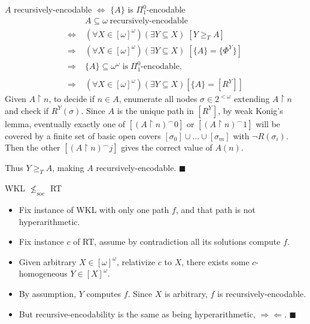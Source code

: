 \begin{frame}{$A$ recursively-encodable $\Leftrightarrow$
$\{A\}$ is $\Pi_1^0$-encodable}
  \begin{align*}
    \;&A\subseteq\omega\; \text{recursively-encodable}\\
    \Leftrightarrow\; & (\forall X\in[\omega]^\omega)(\exists Y\subseteq
      X)\; [Y\geq_T A]\\
    \Rightarrow\; & (\forall X\in[\omega]^\omega)(\exists Y\subseteq X)\;
      [\{A\}=\{\Phi^Y\}]\\
    \Rightarrow\; &\{A\}\subseteq\omega^\omega\; \text{is}\;
      \Pi_1^0\text{-encodable},\\
    &\\
    \Rightarrow\; & (\forall X\in[\omega]^\omega)(\exists Y\subseteq
      X) [\{A\}=[R^Y]]
  \end{align*}
  Given $A\restriction n$, to decide if $n\in A$, enumerate all nodes
  $\sigma\in2^{<\omega}$ extending $A\restriction n$ and check if
  $R^Y(\sigma)$. Since $A$ is the unique path in $[R^Y]$, by weak Konig's
  lemma, eventually exactly one of $[(A\restriction n)^\frown 0]$ or
  $[(A\restriction n)^\frown 1]$ will be covered by a finite set of basic
  open covers $[\sigma_0]\cup\ldots\cup[\sigma_m]$ with $\neg R(\sigma_i)$.
  Then the other $[(A\restriction n)^\frown j]$ gives the correct value
  of $A(n)$.
  \vspace{0.5em}

  Thus $Y\geq_TA$, making $A$ recursively-encodable. $\blacksquare$
\end{frame}

\begin{frame}{WKL $\nleq_{\text{soc}}$ RT}
  \begin{itemize}
    \item Fix instance of WKL with only one path $f$, and that path is
      not hyperarithmetic.
    \item Fix instance $c$ of RT, assume by contradiction all
      its solutions compute $f$.
    \item Given arbitrary $X\in[\omega]^\omega$, relativize $c$ to
      $X$, there exists some $c$-homogeneous $Y\in[X]^\omega$.
    \item By assumption, $Y$ computes $f$. Since $X$ is arbitrary, $f$ is
      recursively-encodable.
    \item But recursive-encodability is the same as being
      hyperarithmetic, $\Rightarrow\Leftarrow$. $\blacksquare$
  \end{itemize}
\end{frame}
